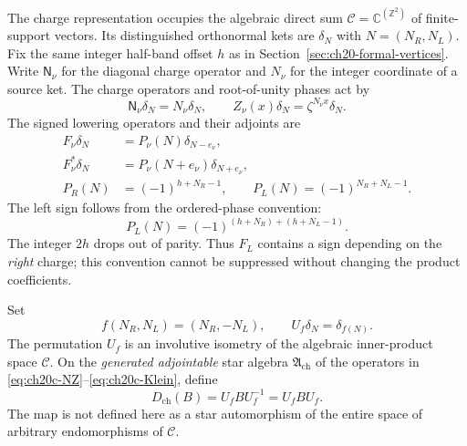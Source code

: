 The charge representation occupies the algebraic direct sum
$\mathcal C=\mathbb C^{(\mathbb Z^2)}$ of finite-support vectors.
Its distinguished orthonormal kets are $\delta_N$ with
$N=(N_R,N_L)$.  Fix the same integer half-band offset $h$ as in
Section~\ref{sec:ch20-formal-vertices}.  Write $\mathsf N_\nu$ for the diagonal charge operator and
$N_\nu$ for the integer coordinate of a source ket.  The charge
operators and root-of-unity phases act by
\begin{equation}
 \mathsf N_\nu\delta_N=N_\nu\delta_N,
 \qquad Z_\nu(x)\delta_N=\zeta^{N_\nu x}\delta_N.
 \label{eq:ch20c-NZ}
\end{equation}
The signed lowering operators and their adjoints are
\begin{align}
 F_\nu\delta_N&=P_\nu(N)\delta_{N-e_\nu},\nonumber\\
 F_\nu^*\delta_N&=P_\nu(N+e_\nu)\delta_{N+e_\nu},\nonumber\\
 P_R(N)&=(-1)^{h+N_R-1},\qquad
 P_L(N)=(-1)^{N_R+N_L-1}.
 \label{eq:ch20c-Klein}
\end{align}
The left sign follows from the ordered-phase convention:
\[
 P_L(N)=(-1)^{(h+N_R)+(h+N_L-1)}.
\]
The integer $2h$ drops out of parity.  Thus $F_L$ contains a sign
depending on the \emph{right} charge; this convention cannot be
suppressed without changing the product coefficients.

\begin{definition}
\label{def:ch20c-charge}
Set
\begin{equation}
 f(N_R,N_L)=(N_R,-N_L),\qquad
 U_f\delta_N=\delta_{f(N)}.
 \label{eq:ch20c-f}
\end{equation}
The permutation $U_f$ is an involutive isometry of the algebraic
inner-product space $\mathcal C$.  On the \emph{generated adjointable}
star algebra $\mathfrak A_{\mathrm{ch}}$ of the operators in
\eqref{eq:ch20c-NZ}--\eqref{eq:ch20c-Klein}, define
\begin{equation}
 D_{\mathrm{ch}}(B)=U_fBU_f^{-1}=U_fBU_f.
 \label{eq:ch20c-Dcharge}
\end{equation}
The map is not defined here as a star automorphism of the entire
space of arbitrary endomorphisms of $\mathcal C$.
\end{definition}

